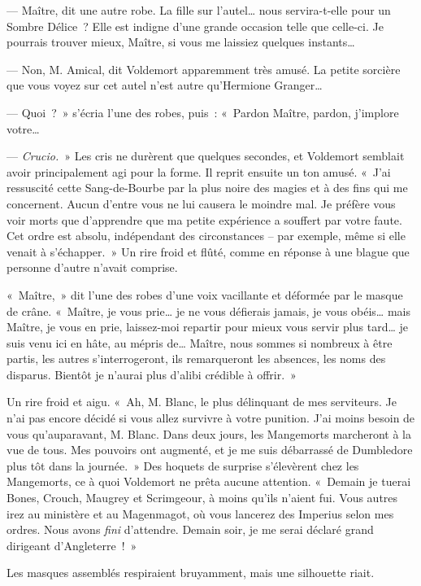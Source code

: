 --- Maître, dit une autre robe.
La fille sur l'autel… nous servira-t-elle pour un Sombre Délice~?
Elle est indigne d'une grande occasion telle que celle-ci.
Je pourrais trouver mieux, Maître, si vous me laissiez quelques instants…

--- Non, M. Amical, dit Voldemort apparemment très amusé.
La petite sorcière que vous voyez sur cet autel n'est autre qu'Hermione Granger…

--- Quoi~?~»
s'écria l'une des robes, puis~: «~Pardon Maître, pardon, j'implore votre…

--- \emph{Crucio.}~» Les cris ne durèrent que quelques secondes, et Voldemort semblait avoir principalement agi pour la forme.
Il reprit ensuite un ton amusé.
«~J'ai ressuscité cette Sang-de-Bourbe par la plus noire des magies et à des fins qui me concernent.
Aucun d'entre vous ne lui causera le moindre mal.
Je préfère vous voir morts que d'apprendre que ma petite expérience a souffert par votre faute.
Cet ordre est absolu, indépendant des circonstances -- par exemple, même si elle venait à s'échapper.~»
Un rire froid et flûté, comme en réponse à une blague que personne d'autre n'avait comprise.

«~Maître,~» dit l'une des robes d'une voix vacillante et déformée par le masque de crâne.
«~Maître, je vous prie… je ne vous défierais jamais, je vous obéis… mais Maître, je vous en prie, laissez-moi repartir pour mieux vous servir plus tard… je suis venu ici en hâte, au mépris de…
Maître, nous sommes si nombreux à être partis, les autres s'interrogeront, ils remarqueront les absences, les noms des disparus.
Bientôt je n'aurai plus d'alibi crédible à offrir.~»

Un rire froid et aigu.
«~Ah, M. Blanc, le plus délinquant de mes serviteurs.
Je n'ai pas encore décidé si vous allez survivre à votre punition.
J'ai moins besoin de vous qu'auparavant, M. Blanc.
Dans deux jours, les Mangemorts marcheront à la vue de tous.
Mes pouvoirs ont augmenté, et je me suis débarrassé de Dumbledore plus tôt dans la journée.~»
Des hoquets de surprise s'élevèrent chez les Mangemorts, ce à quoi Voldemort ne prêta aucune attention.
«~Demain je tuerai Bones, Crouch, Maugrey et Scrimgeour, à moins qu'ils n'aient fui.
Vous autres irez au ministère et au Magenmagot, où vous lancerez des Imperius selon mes ordres.
Nous avons \emph{fini} d'attendre.
Demain soir, je me serai déclaré grand dirigeant d'Angleterre~!~»

Les masques assemblés respiraient bruyamment, mais une silhouette riait.

